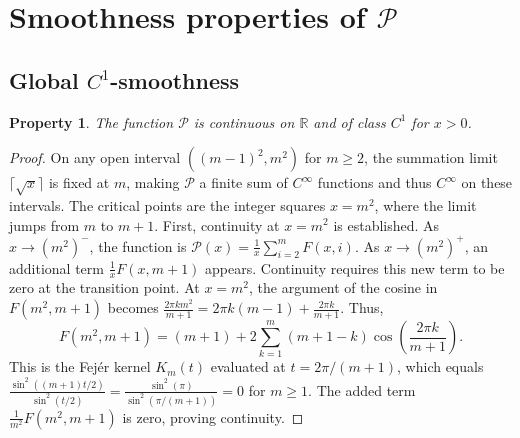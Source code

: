\documentclass[11pt,a4paper]{amsart}
\newcommand{\Px}{\mathcal{P}}
\newcommand{\R}{\mathbb{R}}
\theoremstyle{plain}
\newtheorem{property}[theorem]{Property}
\theoremstyle{definition}
\begin{document}
\section{Smoothness properties of $\Px$}

\subsection{Global $C^{1}$-smoothness}
\begin{property}\label{prop:C1}
The function $\Px$ is continuous on $\R$ and of class $C^1$ for $x>0$.
\end{property}
\begin{proof}
On any open interval $((m-1)^2, m^2)$ for $m\ge 2$, the summation limit $\lceil\sqrt{x}\rceil$ is fixed at $m$, making $\Px$ a finite sum of $C^\infty$ functions and thus $C^\infty$ on these intervals.
The critical points are the integer squares $x=m^2$, where the limit jumps from $m$ to $m+1$.
First, continuity at $x=m^2$ is established. As $x \to (m^2)^-$, the function is $\Px(x) = \frac{1}{x}\sum_{i=2}^{m} F(x,i)$.
As $x \to (m^2)^+$, an additional term $\frac{1}{x}F(x,m+1)$ appears. Continuity requires this new term to be zero at the transition point.
At $x=m^2$, the argument of the cosine in $F(m^2, m+1)$ becomes $\frac{2\pi k m^2}{m+1} = 2\pi k(m-1) + \frac{2\pi k}{m+1}$.
Thus,
\[ F(m^2, m+1) = (m+1) + 2\sum_{k=1}^{m}(m+1-k)\cos\left(\frac{2\pi k}{m+1}\right). \]
This is the Fejér kernel $K_m(t)$ evaluated at $t=2\pi/(m+1)$, which equals $\frac{\sin^2((m+1)t/2)}{\sin^2(t/2)} = \frac{\sin^2(\pi)}{\sin^2(\pi/(m+1))} = 0$ for $m \ge 1$.
The added term $\frac{1}{m^2}F(m^2, m+1)$ is zero, proving continuity.


\end{proof}
\end{document}
